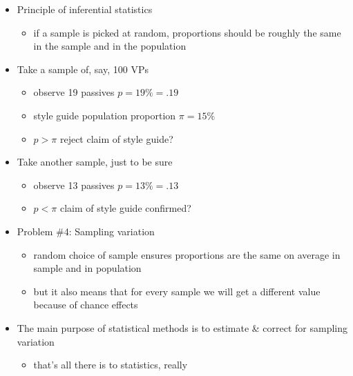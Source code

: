 \documentclass[a4paper,landscape,headrule,footrule,xetex]{foils}
\begin{document}
\begin{itemize}
\item Principle of inferential statistics
\begin{itemize}
\item if a sample is picked at random, proportions should be
roughly the same in the sample and in the population
\end{itemize}
\item Take a sample of, say, 100 VPs
\begin{itemize}
\item observe 19 passives \into $p = 19\% = .19$
\item style guide \into population proportion $\pi = 15\%$
\item $p > \pi$ \into reject claim of style guide?
\end{itemize}
\item Take another sample, just to be sure
\begin{itemize}
\item observe 13 passives \into $p = 13\% = .13$
\item $p < \pi$ \into claim of style guide confirmed?
\end{itemize}
\end{itemize}

\begin{itemize}
\item Problem \#4: Sampling variation
  \begin{itemize}
  \item random choice of sample ensures proportions are the
    same on average in sample and in population
\item but it also means that for every sample we will get a
different value because of chance effects
\into {}
\end{itemize}
\item The main purpose of statistical methods is to
estimate \& correct for sampling variation
\begin{itemize}
\item that's all there is to statistics, really \smiley
\end{itemize}
\end{itemize}
\end{document}
